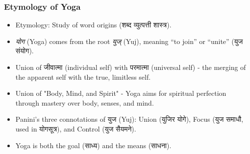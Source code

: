 \begin{frame}[fragile]\frametitle{Etymology of Yoga}

  \begin{itemize}
    \item Etymology: Study of word origins (शब्द व्युत्पत्ती शास्त्र).
	\item \textit{योग} (Yoga) comes from the root \textit{युज्} (Yuj), meaning “to join” or “unite” (युज संयोग).
	\item Union of जीवात्मा (individual self) with परमात्मा (universal self) - the merging of the apparent self with the true, limitless self.
    \item Union of "Body, Mind, and Spirit" - Yoga aims for spiritual perfection through mastery over body, senses, and mind.
	\item Panini’s three connotations of युज (Yuj): Union (युजिर योगे), Focus (युज समाधौ, used in योगसूत्र), and Control (युज सैयमने).
	\item Yoga is both the goal (साध्य) and the means (साधना).
  \end{itemize}

\end{frame}

